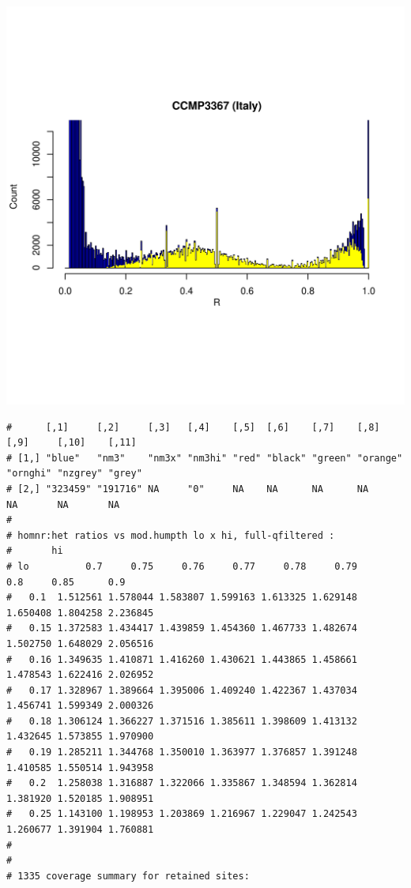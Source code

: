 \documentclass{article}\usepackage[]{graphicx}\usepackage[]{color}
\makeatletter
\def\maxwidth{ %
  \ifdim\Gin@nat@width>\linewidth
    \linewidth
  \else
    \Gin@nat@width
  \fi
}
\newenvironment{kframe}{%
 \def\at@end@of@kframe{}%
 \ifinner\ifhmode%
  \def\at@end@of@kframe{\end{minipage}}%
  \begin{minipage}{\columnwidth}%
 \fi\fi%
 \def\FrameCommand##1{\hskip\@totalleftmargin \hskip-\fboxsep
 \colorbox{shadecolor}{##1}\hskip-\fboxsep
     \hskip-\linewidth \hskip-\@totalleftmargin \hskip\columnwidth}%
 \MakeFramed {\advance\hsize-\width
   \@totalleftmargin\z@ \linewidth\hsize
   \@setminipage}}%
 {\par\unskip\endMakeFramed%
 \at@end@of@kframe}
\newenvironment{knitrout}{}{} %
\makeatother
\begin{document}
\begin{knitrout}
\includegraphics[width=\maxwidth]{FigS7-hwe-histo-figs-knitr/unnamed-chunk-10-39} 
\begin{kframe}\begin{verbatim}
#      [,1]     [,2]     [,3]   [,4]    [,5]  [,6]    [,7]    [,8]     [,9]     [,10]    [,11] 
# [1,] "blue"   "nm3"    "nm3x" "nm3hi" "red" "black" "green" "orange" "ornghi" "nzgrey" "grey"
# [2,] "323459" "191716" NA     "0"     NA    NA      NA      NA       NA       NA       NA
# 
# homnr:het ratios vs mod.humpth lo x hi, full-qfiltered :
#       hi
# lo          0.7     0.75     0.76     0.77     0.78     0.79      0.8     0.85      0.9
#   0.1  1.512561 1.578044 1.583807 1.599163 1.613325 1.629148 1.650408 1.804258 2.236845
#   0.15 1.372583 1.434417 1.439859 1.454360 1.467733 1.482674 1.502750 1.648029 2.056516
#   0.16 1.349635 1.410871 1.416260 1.430621 1.443865 1.458661 1.478543 1.622416 2.026952
#   0.17 1.328967 1.389664 1.395006 1.409240 1.422367 1.437034 1.456741 1.599349 2.000326
#   0.18 1.306124 1.366227 1.371516 1.385611 1.398609 1.413132 1.432645 1.573855 1.970900
#   0.19 1.285211 1.344768 1.350010 1.363977 1.376857 1.391248 1.410585 1.550514 1.943958
#   0.2  1.258038 1.316887 1.322066 1.335867 1.348594 1.362814 1.381920 1.520185 1.908951
#   0.25 1.143100 1.198953 1.203869 1.216967 1.229047 1.242543 1.260677 1.391904 1.760881
# 
# 
# 1335 coverage summary for retained sites:

\end{verbatim}
\end{kframe}
\end{knitrout}
\end{document}
